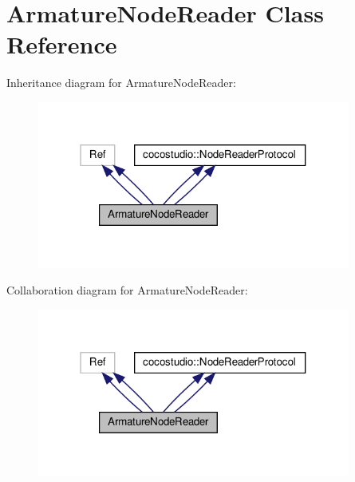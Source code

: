 \hypertarget{classArmatureNodeReader}{}\section{Armature\+Node\+Reader Class Reference}
\label{classArmatureNodeReader}


Inheritance diagram for Armature\+Node\+Reader\+:
\nopagebreak
\begin{figure}[H]
\begin{center}
\leavevmode
\includegraphics[width=292pt]{classArmatureNodeReader__inherit__graph}
\end{center}
\end{figure}


Collaboration diagram for Armature\+Node\+Reader\+:
\nopagebreak
\begin{figure}[H]
\begin{center}
\leavevmode
\includegraphics[width=292pt]{classArmatureNodeReader__coll__graph}
\end{center}
\end{figure}
